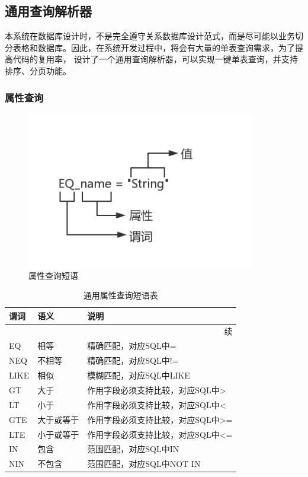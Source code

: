\documentclass[titlepage,UTF8,linespread=1.5]{ctexart}
\begin{document}
\subsection{通用查询解析器}
本系统在数据库设计时，不是完全遵守关系数据库设计范式，而是尽可能以业务切分表格和数据库。因此，在系统开发过程中，将会有大量的单表查询需求，为了提高代码的复用率，
设计了一个通用查询解析器，可以实现一键单表查询，并支持排序、分页功能。\par
\subsubsection{属性查询}
\begin{figure}[H]
    \centering
    \includegraphics[width=100mm]{query_field.png}
    \caption{属性查询短语}
    \label{fig:query_field}
\end{figure}

\begin{longtable}{|p{10em}|p{6em}|p{15em}|}
	\caption{通用属性查询短语表}\label{tab:query_field}   \\\hline
	谓词 & 语义       & 说明                              \\\hline
	\endfirsthead
	\multicolumn{3}{r}{{续\tablename\thetable{}}}         \\\hline
	\endhead
	EQ   & 相等       & 精确匹配，对应SQL中=              \\\hline
	NEQ  & 不相等     & 精确匹配，对应SQL中!=             \\\hline
	LIKE & 相似       & 模糊匹配，对应SQL中LIKE           \\\hline
	GT   & 大于       & 作用字段必须支持比较，对应SQL中>  \\\hline
	LT   & 小于       & 作用字段必须支持比较，对应SQL中<  \\\hline
	GTE  & 大于或等于 & 作用字段必须支持比较，对应SQL中>= \\\hline
	LTE  & 小于或等于 & 作用字段必须支持比较，对应SQL中<= \\\hline
	IN   & 包含       & 范围匹配，对应SQL中IN             \\\hline
	NIN  & 不包含     & 范围匹配，对应SQL中NOT IN         \\\hline
\end{longtable}\par
\end{document}
